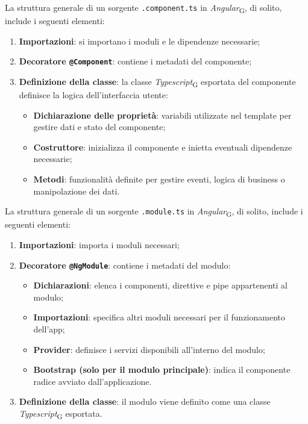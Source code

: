 La struttura generale di un sorgente \texttt{.component.ts} in \textit{Angular}\textsubscript{G}, di solito, include i seguenti elementi:
\begin{enumerate}
    \item \textbf{Importazioni}: si importano i moduli e le dipendenze necessarie; 
    \item \textbf{Decoratore \texttt{@Component}}: contiene i metadati del componente;
    \item \textbf{Definizione della classe}: la classe \textit{Typescript}\textsubscript{G} esportata del componente definisce la logica dell'interfaccia utente:
    \begin{itemize}
        \item \textbf{Dichiarazione delle proprietà}: variabili utilizzate nel template per gestire dati e stato del componente;
        \item \textbf{Costruttore}: inizializza il componente e inietta eventuali dipendenze necessarie;
        \item \textbf{Metodi}: funzionalità definite per gestire eventi, logica di business o manipolazione dei dati.
    \end{itemize}
\end{enumerate}

La struttura generale di un sorgente \texttt{.module.ts} in \textit{Angular}\textsubscript{G}, di solito, include i seguenti elementi:
\begin{enumerate}
    \item \textbf{Importazioni}: importa i moduli necessari;  
    \item \textbf{Decoratore \texttt{@NgModule}}: contiene i metadati del modulo:
    \begin{itemize}
        \item \textbf{Dichiarazioni}: elenca i componenti, direttive e pipe appartenenti al modulo;
        \item \textbf{Importazioni}: specifica altri moduli necessari per il funzionamento dell’app;
        \item \textbf{Provider}: definisce i servizi disponibili all'interno del modulo;
        \item \textbf{Bootstrap (solo per il modulo principale)}: indica il componente radice avviato dall'applicazione.
    \end{itemize}
    \item \textbf{Definizione della classe}: il modulo viene definito come una classe \textit{Typescript}\textsubscript{G} esportata.
\end{enumerate}

